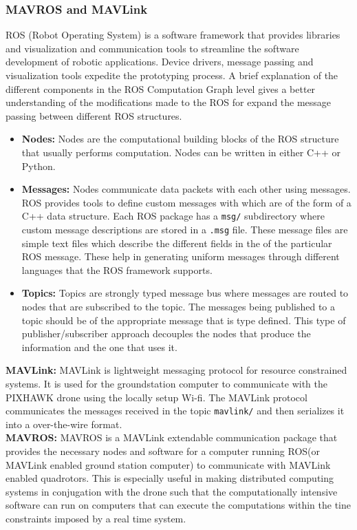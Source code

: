 \documentclass{article}
\begin{document}
\subsubsection{MAVROS and MAVLink}
ROS (Robot Operating System) is a software framework that provides libraries and visualization and communication tools to streamline the software development of robotic applications. Device drivers, message passing and visualization tools expedite the prototyping process. 
A brief explanation of the different components in the ROS Computation Graph level gives a better understanding of the modifications made to the ROS for expand the message passing between different ROS structures. 

\begin{itemize}
	\item \textbf{Nodes:} Nodes are the computational building blocks of the ROS structure that usually performs computation. Nodes can be written in either C++ or Python. 
	\item \textbf{Messages:} Nodes communicate data packets with each other using messages. ROS provides tools to define custom messages with which are of the form of a C++ data structure. Each ROS package has a \texttt{msg/} subdirectory where custom message descriptions are stored in a \texttt{.msg} file. These message files are simple text files which describe the different fields in the of the particular ROS message. These help in generating uniform messages through different languages that the ROS framework supports. 
	\item \textbf{Topics:} Topics are strongly typed message bus where messages are routed to nodes that are subscribed to the topic. The messages being published to a topic should be of the appropriate message that is type defined. This type of publisher/subscriber approach decouples the nodes that produce the information and the one that uses it. 
\end{itemize}
\textbf{MAVLink:} MAVLink is lightweight messaging protocol for resource constrained systems. It is used for the groundstation computer to communicate with the PIXHAWK drone using the locally setup Wi-fi. The MAVLink protocol communicates the messages received in the topic \texttt{mavlink/} and then serializes it into a over-the-wire format.\\
\textbf{MAVROS:} MAVROS is a MAVLink extendable communication package that provides the necessary nodes and software for a computer running ROS(or MAVLink enabled ground station computer) to communicate with MAVLink enabled quadrotors. This is especially useful in making distributed computing systems in conjugation with the drone such that the computationally intensive software can run on computers that can execute the computations within the tine constraints imposed by a real time system.\\
\end{document}
